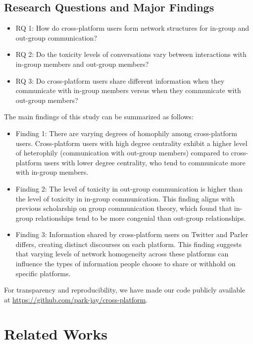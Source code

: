 \documentclass[Crown,sagev,times]{sagej}
\begin{document}
 \subsection{Research Questions and Major Findings}

\begin{itemize}
    \item RQ 1: How do cross-platform users form network structures for in-group and out-group communication?
    \item RQ 2: Do the toxicity levels of conversations vary between interactions with in-group members and out-group members?
    \item RQ 3: Do cross-platform users share different information when they communicate with in-group members versus when they communicate with out-group members?
\end{itemize}

The main findings of this study can be summarized as follows: 

 \begin{itemize}
     \item Finding 1: There are varying degrees of homophily among cross-platform users. Cross-platform users with high degree centrality exhibit a higher level of heterophily (communication with out-group members) compared to cross-platform users with lower degree centrality, who tend to communicate more with in-group members. 
     \item Finding 2: The level of toxicity in out-group communication is higher than the level of toxicity in in-group communication. This finding aligns with previous scholarship on group communication theory, which found that in-group relationships tend to be more congenial than out-group relationships.
    \item Finding 3: Information shared by cross-platform users on Twitter and Parler differs, creating distinct discourses on each platform. This finding suggests that varying levels of network homogeneity across these platforms can influence the types of information people choose to share or withhold on specific platforms.
 \end{itemize}

For transparency and reproducibility, we have made our code publicly available at \url{https://github.com/park-jay/cross-platform}. 

\section{Related Works} \label{sec:related_works}
\end{document}
